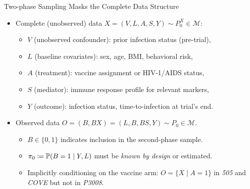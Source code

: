 \documentclass{beamer}
\begin{document}

\begin{frame}[c]{Two-phase Sampling Masks the Complete Data Structure}

\begin{center}
\begin{itemize}
  \itemsep8pt
  \item Complete (unobserved) data $X = (V, L, A, S, Y) \sim P_0^X \in
    \mathcal{M}$:
    \begin{itemize}
      \itemsep4pt
      \item $V$ (unobserved confounder): prior infection status (pre-trial),
      \item $L$ (baseline covariates): sex, age, BMI, behavioral risk,
      \item $A$ (treatment): vaccine assignment or HIV-1/AIDS status,
      \item $S$ (mediator): immune response profile for relevant markers,
      \item $Y$ (outcome): infection status, time-to-infection at trial's
        end.
    \end{itemize}
  \item Observed data $O = (B, BX) = (L, B, BS, Y) \sim P_0 \in \mathcal{M}$.
    \begin{itemize}
      \itemsep4pt
      \item $B \in \{0,1\}$ indicates inclusion in the second-phase sample.
      \item $\pi_0 \coloneqq \mathbb{P}(B = 1 \mid Y, L)$ must be \textit{known by
        design} or estimated.
      \item Implicitly conditioning on the vaccine arm: $O = \{X \mid A = 1\}$
      in \textit{505} and \textit{COVE} but not in \textit{P3008}.
    \end{itemize}
\end{itemize}
\end{center}


\end{frame}

\end{document}
